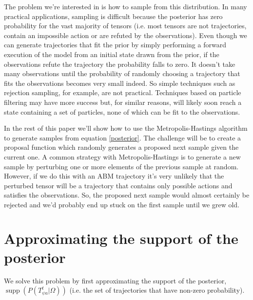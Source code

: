 \documentclass{article}
\DeclareMathOperator\supp{supp}
\begin{document}
The problem we're interested in is how to sample from this distribution. In many practical applications, sampling is difficult because the posterior has zero probability for the vast majority of tensors (i.e. most tensors are not trajectories, contain an impossible action or are refuted by the observations). Even though we can generate trajectories that fit the prior by simply performing a forward execution of the model from an initial state drawn from the prior, if the observations refute the trajectory the probability falls to zero. It doesn't take many observations until the probability of randomly choosing a trajectory that fits the observations becomes very small indeed. So simple techniques such as rejection sampling, for example, are not practical. Techniques based on particle filtering may have more success but, for similar reasons, will likely soon reach a state containing a set of particles, none of which can be fit to the observations.

In the rest of this paper we'll show how to use the Metropolis-Hastings algorithm to generate samples from equation \eqref{posterior}. The challenge will be to create a proposal function which randomly generates a proposed next sample given the current one. A common strategy with Metropolis-Hastings is to generate a new sample by perturbing one or more elements of the previous sample at random. However, if we do this with an ABM trajectory it's very unlikely that the perturbed tensor will be a trajectory that contains only possible actions and satisfies the observations. So, the proposed next sample would almost certainly be rejected and we'd probably end up stuck on the first sample until we grew old.

\section{Approximating the support of the posterior}

We solve this problem by first approximating the support of the posterior, $\supp(P(T^t_{\psi a}|\Omega))$ (i.e. the set of trajectories that have non-zero probability).
\end{document}

